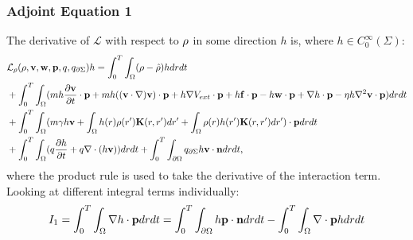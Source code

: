\subsubsection{Adjoint Equation 1}

The derivative of $\mathcal{L}$ with respect to $\rho$ in some direction $h$ is, where ${h} \in C_0^\infty(\Sigma) $:
\begin{align*}
&\mathcal{L}_\rho(\rho,\mathbf{v},\mathbf{w},\mathbf{p},q,{q}_{\partial \Sigma})h = \int_0^T \int_\Omega  (\rho - \hat {\rho})h drdt \\
&+ \int_0^T \int_\Omega (m h \frac{\partial \mathbf{v}}{\partial t}\cdot \mathbf{p} + m h( (\mathbf{v} \cdot \nabla)\mathbf{v} )\cdot \mathbf{p}+ h\nabla V_{ext}\cdot \mathbf{p} + h \mathbf{f} \cdot  \mathbf{p} - h \mathbf{w} \cdot \mathbf{p} + \nabla h\cdot \mathbf{p} - \eta h \nabla^2 \mathbf{v} \cdot \mathbf{p})  dr dt\\
&+ \int_0^T \int_\Omega (m\gamma h \mathbf{v} +\int_\Omega h(r) \rho(r') \mathbf{K}(r,r')dr'+\int_\Omega \rho(r) h(r') \mathbf{K}(r,r') dr') \cdot \mathbf{p} dr dt\\
& + \int_0^T \int_\Omega (q\frac{\partial h}{\partial t} + q\nabla \cdot (h \mathbf{v}))  dr dt +\int_0^T \int_{\partial\Omega} {q}_{\partial \Sigma} h\mathbf{v} \cdot \mathbf{n}  dr dt,
\end{align*}
where the product rule is used to take the derivative of the interaction term.
Looking at different integral terms individually:
\begin{align*}
I_1= \int_0^T \int_\Omega \nabla h\cdot \mathbf{p} dr dt = \int_0^T \int_{\partial \Omega} h \mathbf{p} \cdot \mathbf{n} dr dt - \int_0^T \int_{\Omega} \nabla\cdot \mathbf{p} h dr dt
\end{align*}
 
